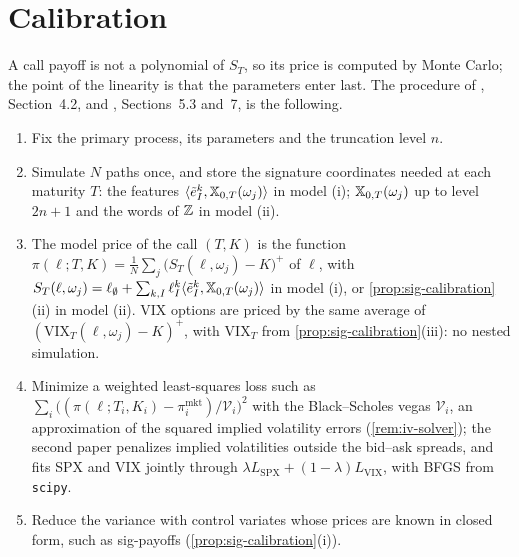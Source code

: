 \section{Calibration}\label{sec:sig-calibration}

A call payoff is not a polynomial of $S_T$, so its price is computed by Monte Carlo; the point of the
linearity is that the parameters enter last. The procedure of \textcite{cuchiero-gazzani-svaluto-ferro-2023},
Section~4.2, and \textcite{cuchiero-gazzani-moller-svaluto-ferro-2025}, Sections~5.3 and~7, is the following.
\begin{enumerate}[label=(\arabic*)]
  \item Fix the primary process, its parameters and the truncation level $n$.
  \item Simulate $N$ paths once, and store the signature coordinates needed at each maturity $T$: the
    features $\langle\tilde e^k_I,\mathbb X_{0,T}(\omega_j)\rangle$ in model (i); $\mathbb X_{0,T}(\omega_j)$ up to level $2n+1$ and the
    words of $\mathbb Z$ in model (ii).
  \item The model price of the call $(T,K)$ is the function
    $\pi(\ell;T,K)=\frac1N\sum_j\big(S_T(\ell,\omega_j)-K\big)^+$ of $\ell$, with
    $S_T(\ell,\omega_j)=\ell_\emptyset+\sum_{k,I}\ell^k_I\langle\tilde e^k_I,\mathbb X_{0,T}(\omega_j)\rangle$ in model (i), or
    \cref{prop:sig-calibration}(ii) in model (ii). VIX options are priced by the same average of
    $(\mathrm{VIX}_T(\ell,\omega_j)-K)^+$, with $\mathrm{VIX}_T$ from \cref{prop:sig-calibration}(iii): no nested simulation.
  \item Minimize a weighted least-squares loss such as
    $\sum_i\big((\pi(\ell;T_i,K_i)-\pi_i^{\mathrm{mkt}})/\mathcal V_i\big)^2$ with the Black--Scholes vegas $\mathcal V_i$,
    an approximation of the squared implied volatility errors (\cref{rem:iv-solver}); the second paper
    penalizes implied volatilities outside the bid--ask spreads, and fits SPX and VIX jointly through
    $\lambda L_{\mathrm{SPX}}+(1-\lambda)L_{\mathrm{VIX}}$, with BFGS from \texttt{scipy}.
  \item Reduce the variance with control variates whose prices are known in closed form, such as
    sig-payoffs (\cref{prop:sig-calibration}(i)).
\end{enumerate}

